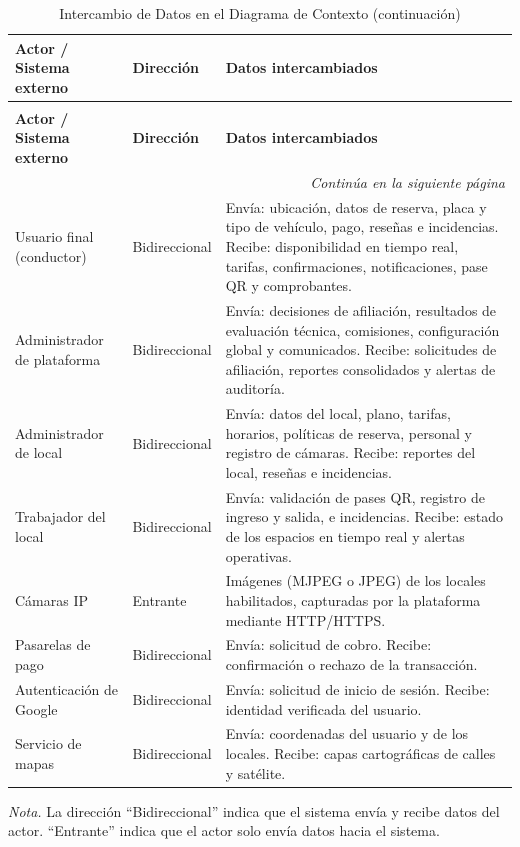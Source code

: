 \begin{longtable}{p{3.5cm} p{2cm} p{8.5cm}}
\caption{Intercambio de Datos en el Diagrama de Contexto} \\
\toprule
\textbf{Actor / Sistema externo} & \textbf{Dirección} & \textbf{Datos intercambiados} \\
\midrule
\endfirsthead

\caption[]{Intercambio de Datos en el Diagrama de Contexto (continuación)} \\
\toprule
\textbf{Actor / Sistema externo} & \textbf{Dirección} & \textbf{Datos intercambiados} \\
\midrule
\endhead

\midrule
\multicolumn{3}{r}{\footnotesize\textit{Continúa en la siguiente página}} \\
\endfoot

\bottomrule
\endlastfoot

Usuario final (conductor) & Bidireccional & Envía: ubicación, datos de reserva, placa y tipo de vehículo, pago, reseñas e incidencias. Recibe: disponibilidad en tiempo real, tarifas, confirmaciones, notificaciones, pase QR y comprobantes. \\
\midrule
Administrador de plataforma & Bidireccional & Envía: decisiones de afiliación, resultados de evaluación técnica, comisiones, configuración global y comunicados. Recibe: solicitudes de afiliación, reportes consolidados y alertas de auditoría. \\
\midrule
Administrador de local & Bidireccional & Envía: datos del local, plano, tarifas, horarios, políticas de reserva, personal y registro de cámaras. Recibe: reportes del local, reseñas e incidencias. \\
\midrule
Trabajador del local & Bidireccional & Envía: validación de pases QR, registro de ingreso y salida, e incidencias. Recibe: estado de los espacios en tiempo real y alertas operativas. \\
\midrule
Cámaras IP & Entrante & Imágenes (MJPEG o JPEG) de los locales habilitados, capturadas por la plataforma mediante HTTP/HTTPS. \\
\midrule
Pasarelas de pago & Bidireccional & Envía: solicitud de cobro. Recibe: confirmación o rechazo de la transacción. \\
\midrule
Autenticación de Google & Bidireccional & Envía: solicitud de inicio de sesión. Recibe: identidad verificada del usuario. \\
\midrule
Servicio de mapas & Bidireccional & Envía: coordenadas del usuario y de los locales. Recibe: capas cartográficas de calles y satélite. \\
\end{longtable}

\textit{Nota.} La dirección ``Bidireccional'' indica que el sistema envía y recibe datos del actor. ``Entrante'' indica que el actor solo envía datos hacia el sistema.
